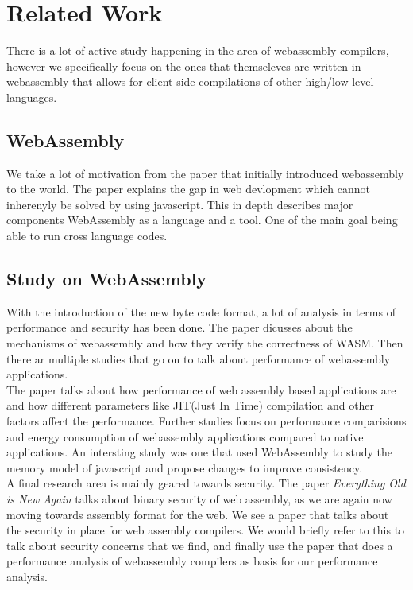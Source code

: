 \section{Related Work}
There is a lot of active study happening in the area of webassembly compilers, however we specifically focus on the ones that themseleves are written in webassembly that allows for client side compilations of other high/low level languages.

\subsection*{WebAssembly}
We take a lot of motivation from the paper that initially introduced webassembly to the world\cite{wasm}. The paper explains the gap in web devlopment which cannot inherenyly be solved by using javascript. This in depth describes major components WebAssembly as a language and a tool. One of the main goal being able to run cross language codes.

\subsection*{Study on WebAssembly}
With the introduction of the new byte code format, a lot of analysis in terms of performance and security has been done. The paper \cite{wasm-mech-verify} dicusses about the mechanisms of webassembly and how they verify the correctness of WASM. Then there ar multiple studies that go on to talk about performance of webassembly applications. \\
The paper \cite{wasm-perf-0} talks about how performance of web assembly based applications are and how different parameters like JIT(Just In Time) compilation and other factors affect the performance. Further studies focus on performance comparisions and energy consumption of webassembly applications compared to native applications\cite{wasm-perf-comp-0}. An intersting study was one that used WebAssembly to study the memory model of javascript and propose changes to improve consistency\cite{wasm-js-memory}. \\
A final research area is mainly geared towards security. The paper \textit{Everything Old is New Again}\cite{wasm-secur-0} talks about binary security of web assembly, as we are again now moving towards assembly format for the web. We see a paper that talks about the security in place for web assembly compilers\cite{wasmsecurity}. We would briefly refer to this to talk about security concerns that we find, and finally use the paper that does a performance analysis of webassembly compilers\cite{wasmtojs} as basis for our performance analysis.


